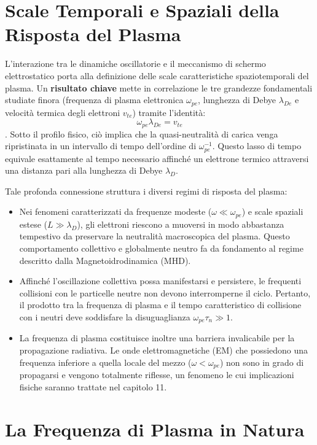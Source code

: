 \section{Scale Temporali e Spaziali della Risposta del Plasma}

L'interazione tra le dinamiche oscillatorie e il meccanismo di schermo elettrostatico porta alla definizione delle scale caratteristiche spaziotemporali del plasma. Un \textbf{risultato chiave} mette in correlazione le tre grandezze fondamentali studiate finora (frequenza di plasma elettronica $\omega_{pe}$, lunghezza di Debye $\lambda_{De}$ e velocità termica degli elettroni $v_{te}$) tramite l'identità:
\begin{equation}
\omega_{pe} \lambda_{De} = v_{te}
\end{equation}
. Sotto il profilo fisico, ciò implica che la quasi-neutralità di carica venga ripristinata in un intervallo di tempo dell'ordine di $\omega_{pe}^{-1}$. Questo lasso di tempo equivale esattamente al tempo necessario affinché un elettrone termico attraversi una distanza pari alla lunghezza di Debye $\lambda_D$.

Tale profonda connessione struttura i diversi regimi di risposta del plasma:
\begin{itemize}
\item Nei fenomeni caratterizzati da frequenze modeste ($\omega \ll \omega_{pe}$) e scale spaziali estese ($L \gg \lambda_D$), gli elettroni riescono a muoversi in modo abbastanza tempestivo da preservare la neutralità macroscopica del plasma. Questo comportamento collettivo e globalmente neutro fa da fondamento al regime descritto dalla Magnetoidrodinamica (MHD).
\item Affinché l'oscillazione collettiva possa manifestarsi e persistere, le frequenti collisioni con le particelle neutre non devono interromperne il ciclo. Pertanto, il prodotto tra la frequenza di plasma e il tempo caratteristico di collisione con i neutri deve soddisfare la disuguaglianza $\omega_{pe} \tau_n \gg 1$.
\item La frequenza di plasma costituisce inoltre una barriera invalicabile per la propagazione radiativa. Le onde elettromagnetiche (EM) che possiedono una frequenza inferiore a quella locale del mezzo ($\omega < \omega_{pe}$) non sono in grado di propagarsi e vengono totalmente riflesse, un fenomeno le cui implicazioni fisiche saranno trattate nel capitolo 11.
\end{itemize}

\section{La Frequenza di Plasma in Natura}


